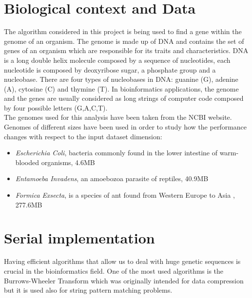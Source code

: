 \documentclass[final,5p,times,twocolumn,authoryear]{elsarticle}
\begin{document}
\section{Biological context and Data}
\label{Biological context and Data}
The algorithm considered in this project is being used to find a gene within the genome of an organism. The genome is made up of DNA and contains the set of genes of an organism which are responsible for its traits and characteristics.
DNA is a long double helix molecule composed by a sequence of nucleotides, each nucleotide is composed by deoxyribose sugar, a phosphate group and a nucleobase\cite{nucleotide}. There are four types of nucleobases in DNA: guanine (G), adenine (A), cytosine (C) and thymine (T).
In bioinformatics applications, the genome and the genes are usually considered as long strings of computer code composed by four possible letters (G,A,C,T). \\
The genomes used for this analysis have been taken from the NCBI website\cite{ncbi}. \\
Genomes of different sizes have been used in order to study how the performance changes with respect to the input dataset dimension:
\begin{itemize}
    \item \emph{Escherichia Coli}, bacteria commonly found in the lower intestine of warm-blooded organisms\cite{ecoli}, 4.6MB \cite{ecoli dataset}
    \item \emph{Entamoeba Invadens}, an amoebozoa parasite of reptiles\cite{entamoeba}, 40.9MB \cite{entamoeba dataset}
    \item \emph{Formica Exsecta}, is a species of ant found from Western Europe to Asia \cite{formica}, 277.6MB \cite{formica dataset}
\end{itemize}


\section{Serial implementation}
Having efficient algorithms that allow us to deal with huge genetic sequences is crucial in the bioinformatics field. One of the most used algorithms is the Burrows-Wheeler Transform which was originally intended for data compression but it is used also for string pattern matching problems.
\end{document}
